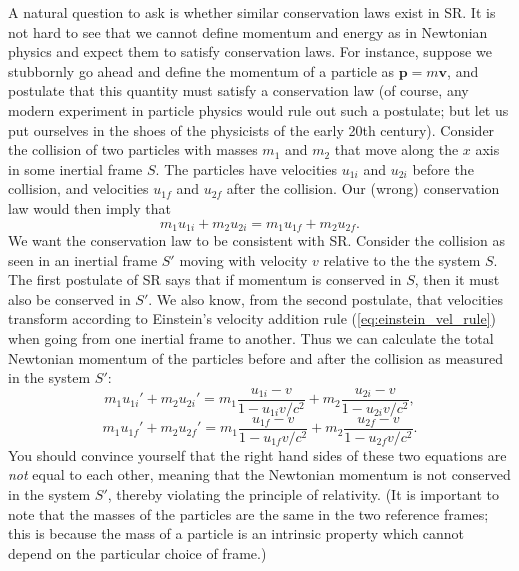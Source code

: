 \documentclass[11pt, a4paper,oneside,openright]{book}
\numberwithin{equation}{section}
\begin{document}
A natural question to ask is whether similar conservation laws exist in SR. It is not hard to see that we cannot define momentum and energy as in Newtonian physics and expect them to satisfy conservation laws. For instance, suppose we stubbornly go ahead and define the momentum of a particle as $\mathbf{p}=m\mathbf{v}$, and postulate that this quantity must satisfy a conservation law (of course, any modern experiment in particle physics would rule out such a postulate; but let us put ourselves in the shoes of the physicists of the early 20th century). Consider the collision of two particles with masses $m_1$ and $m_2$ that move along the $x$ axis in some inertial frame $S$. The particles have velocities $u_{1i}$ and $u_{2i}$ before the collision, and velocities $u_{1f}$ and $u_{2f}$ after the collision. Our (wrong) conservation law would then imply that
\begin{equation}
m_1u_{1i}+m_2u_{2i}=m_1u_{1f}+m_2u_{2f}.
\end{equation}
We want the conservation law to be consistent with SR. Consider the collision as seen in an inertial frame $S'$ moving with velocity $v$ relative to the the system $S$. The first postulate of SR says that if momentum is conserved in $S$, then it must also be conserved in $S'$. We also know, from the second postulate, that velocities transform according to Einstein's velocity addition rule (\ref{eq:einstein_vel_rule}) when going from one inertial frame to another. Thus we can calculate the total Newtonian momentum of the particles before and after the collision as measured in the system $S'$:
\begin{equation}
m_1u_{1i}'+m_2u_{2i}'=m_1\frac{u_{1i}-v}{1-u_{1i}v/c^2}+m_2\frac{u_{2i}-v}{1-u_{2i}v/c^2},
\end{equation}
\begin{equation}
m_1u_{1f}'+m_2u_{2f}'=m_1\frac{u_{1f}-v}{1-u_{1f}v/c^2}+m_2\frac{u_{2f}-v}{1-u_{2f}v/c^2}.
\end{equation}
You should convince yourself that the right hand sides of these two equations are {\it not} equal to each other, meaning that the Newtonian momentum is not conserved in the system $S'$, thereby violating the principle of relativity. (It is important to note that the masses of the particles are the same in the two reference frames; this is because the mass of a particle is an intrinsic property which cannot depend on the particular choice of frame.)

\par\vspace{\baselineskip}
\end{document}
